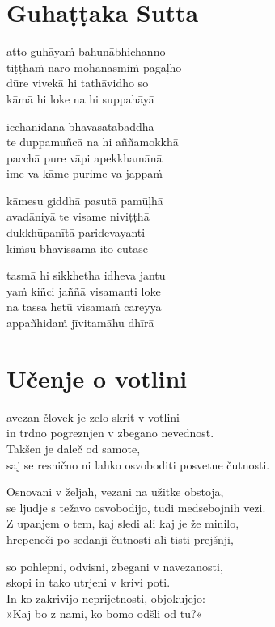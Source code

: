 

\cleartoverso
\chapter*{Guhaṭṭaka Sutta}

atto guhāyaṁ bahunābhichanno\\
tiṭṭhaṁ naro mohanasmiṁ pagāḷho\\
dūre vivekā hi tathāvidho so\\
kāmā hi loke na hi suppahāyā

icchānidānā bhavasātabaddhā\\
te duppamuñcā na hi aññamokkhā\\
pacchā pure vāpi apekkhamānā\\
ime va kāme purime va jappaṁ

kāmesu giddhā pasutā pamūḷhā\\
avadāniyā te visame niviṭṭhā\\
dukkhūpanītā paridevayanti\\
kiṁsū bhavissāma ito cutāse

tasmā hi sikkhetha idheva jantu\\
yaṁ kiñci jaññā visamanti loke\\
na tassa hetū visamaṁ careyya\\
appañhidaṁ jīvitamāhu dhīrā


\cleartorecto
\chapter{Učenje o votlini}

avezan človek je zelo skrit v votlini\\
in trdno pogreznjen v zbegano nevednost.\\
Takšen je daleč od samote,\\
saj se resnično ni lahko osvoboditi posvetne čutnosti.

Osnovani v željah, vezani na užitke obstoja,\\
se ljudje s težavo osvobodijo, tudi medsebojnih vezi.\\
Z upanjem o tem, kaj sledi ali kaj je že minilo,\\
hrepeneči po sedanji čutnosti ali tisti prejšnji,

so pohlepni, odvisni, zbegani v navezanosti,\\
skopi in tako utrjeni v krivi poti.\\
In ko zakrivijo neprijetnosti, objokujejo:\\
»Kaj bo z nami, ko bomo odšli od tu?«

